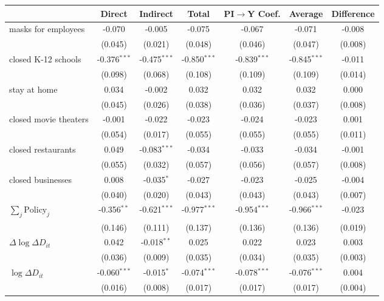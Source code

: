 
\begin{tabular}{lccccc|>{}c}
\toprule
  & Direct & Indirect & Total & PI$\to$Y Coef. & Average & Difference\\
\midrule
masks for employees & -0.070 & -0.005 & -0.075 & -0.067 & -0.071 & -0.008\\
 & (0.045) & (0.021) & (0.048) & (0.046) & (0.047) & (0.008)\\
closed K-12 schools & -0.376$^{***}$ & -0.475$^{***}$ & -0.850$^{***}$ & -0.839$^{***}$ & -0.845$^{***}$ & -0.011\\
 & (0.098) & (0.068) & (0.108) & (0.109) & (0.109) & (0.014)\\
stay at home & 0.034 & -0.002 & 0.032 & 0.032 & 0.032 & 0.000\\
 & (0.045) & (0.026) & (0.038) & (0.036) & (0.037) & (0.008)\\
closed movie theaters & -0.001 & -0.022 & -0.023 & -0.024 & -0.023 & 0.001\\
 & (0.054) & (0.017) & (0.055) & (0.055) & (0.055) & (0.011)\\
closed restaurants & 0.049 & -0.083$^{***}$ & -0.034 & -0.033 & -0.034 & -0.001\\
 & (0.055) & (0.032) & (0.057) & (0.056) & (0.057) & (0.008)\\
closed businesses & 0.008 & -0.035$^{*}$ & -0.027 & -0.023 & -0.025 & -0.004\\
 & (0.040) & (0.020) & (0.043) & (0.043) & (0.043) & (0.007)\\
$\sum_j \mathrm{Policy}_j$ & -0.356$^{**}$ & -0.621$^{***}$ & -0.977$^{***}$ & -0.954$^{***}$ & -0.966$^{***}$ & -0.023\\
 & (0.146) & (0.111) & (0.137) & (0.136) & (0.136) & (0.019)\\
$\Delta \log \Delta D_{it}$ & 0.042 & -0.018$^{**}$ & 0.025 & 0.022 & 0.023 & 0.003\\
 & (0.036) & (0.009) & (0.035) & (0.034) & (0.035) & (0.003)\\
$\log \Delta D_{it}$ & -0.060$^{***}$ & -0.015$^{*}$ & -0.074$^{***}$ & -0.078$^{***}$ & -0.076$^{***}$ & 0.004\\
 & (0.016) & (0.008) & (0.017) & (0.017) & (0.017) & (0.004)\\
\bottomrule
\end{tabular}